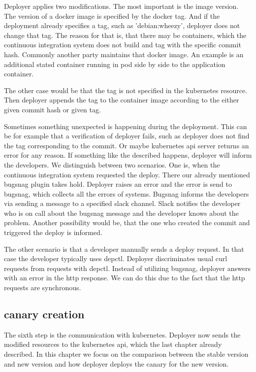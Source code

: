 Deployer applies two modifications. The most important is the image version. The version
of a docker image is specified by the docker tag. And if the deployment already specifies
a tag, such as 'debian:wheezy', deployer does not change that tag. The reason for that is,
that there may be containers, which the continuous integration system does not build and
tag with the specific commit hash. Commonly another party maintains that docker image. An
example is an additional statsd container running in pod side by side to the application
container.

The other case would be that the tag is not specified in the kubernetes resource. Then
deployer appends the tag to the container image according to the either given commit hash
or given tag.

Sometimes something unexpected is happening during the deployment. This can be for example
that a verification of deployer fails, such as deployer does not find the tag
corresponding to the commit. Or maybe kubernetes api server returns an error for any
reason. If something like the described happens, deployer will inform the developers. We
distinguish between two scenarios. One is, when the continuous integration system
requested the deploy. There our already mentioned bugsnag plugin takes hold. Deployer
raises an error and the error is send to bugsnag, which collects all the errors of
systems. Bugsnag informs the developers via sending a message to a specified slack
channel. Slack notifies the developer who is on call about the bugsnag message and the
developer knows about the problem. Another possibility would be, that the one who created
the commit and triggered the deploy is informed.

The other scenario is that a developer manually sends a deploy request. In that case
the developer typically uses depctl. Deployer discriminates usual curl requests from
requests with depctl. Instead of utilizing bugsnag, deployer answers with an error in the
http response. We can do this due to the fact that the http requests are synchronous.

\subsection{canary creation}
The sixth step is the communication with kubernetes. Deployer now sends the modified
resources to the kubernetes api, which the last chapter already described. In this chapter
we focus on the comparison between the stable version and new version and how deployer
deploys the canary for the new version.


